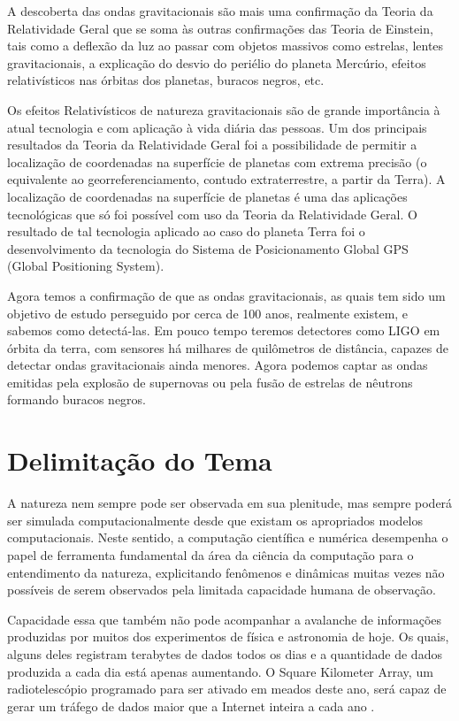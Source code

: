 A descoberta das ondas gravitacionais são mais uma confirmação da Teoria da Relatividade Geral que se soma às outras confirmações das Teoria de Einstein, tais como a deflexão da luz ao passar com objetos massivos como estrelas, lentes gravitacionais, a explicação do desvio do periélio do planeta Mercúrio, efeitos relativísticos nas órbitas dos planetas, buracos negros, etc. 

Os efeitos Relativísticos de natureza gravitacionais são de grande importância à atual tecnologia e com aplicação à vida diária das pessoas. Um dos principais resultados da Teoria da Relatividade Geral foi a possibilidade de permitir a localização de coordenadas na superfície de planetas com extrema precisão (o equivalente ao georreferenciamento, contudo extraterrestre, a partir da Terra). A localização de coordenadas na superfície de planetas é uma das aplicações tecnológicas que só foi possível com uso da Teoria da Relatividade Geral. O resultado de tal tecnologia aplicado ao caso do planeta Terra foi o desenvolvimento da tecnologia do Sistema de Posicionamento Global GPS (Global Positioning System).

Agora temos a confirmação de que as ondas gravitacionais, as quais tem sido um objetivo de estudo perseguido por cerca de 100 anos, realmente existem, e sabemos como detectá-las. Em pouco tempo teremos detectores como LIGO em órbita da terra, com sensores há milhares de quilômetros de distância, capazes de detectar ondas gravitacionais ainda menores. Agora podemos captar as ondas emitidas pela explosão de supernovas ou pela fusão de estrelas de nêutrons formando buracos negros.

\section{Delimitação do Tema}

A natureza nem sempre pode ser observada em sua plenitude, mas sempre poderá ser simulada computacionalmente desde que existam os apropriados modelos computacionais. Neste sentido, a computação científica e numérica desempenha o papel de ferramenta fundamental da área da ciência da computação para o entendimento da natureza, explicitando fenômenos e dinâmicas muitas vezes não possíveis de serem observados pela limitada capacidade humana de observação.

Capacidade essa que também não pode acompanhar a avalanche de informações produzidas por muitos dos experimentos de física e astronomia de hoje. Os quais, alguns deles registram terabytes de dados todos os dias e a quantidade de dados produzida a cada dia está apenas aumentando. O Square Kilometer Array, um radiotelescópio programado para ser ativado em meados deste ano, será capaz de gerar um tráfego de dados maior que a Internet inteira a cada ano \cite{ska,ska-dewdney2009square}.

